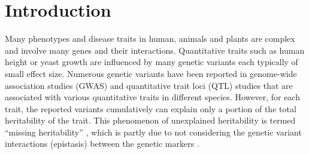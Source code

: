 \documentclass[authoryear,preprint,12pt,3p]{elsarticle}
\begin{document}



\linenumbers
\section{Introduction}
Many phenotypes and disease traits in human, animals and plants are complex and involve many genes and their
interactions.  Quantitative traits such as human height or yeast growth are influenced by many genetic variants each
typically of small effect size.  Numerous genetic variants have been reported in genome-wide association studies (GWAS)
and quantitative trait loci (QTL) studies that are associated with various quantitative traits in different
species. However, for each trait, the reported variants cumulatively can explain only a portion of the total
heritability of the trait.  This phenomenon of unexplained heritability is termed ``missing heritability''
\cite[]{Maher2008}, which is partly due to not considering the genetic variant interactions (epistasis) between the
genetic markers \cite[]{Zuk.et.al.2012}.
\end{document}
